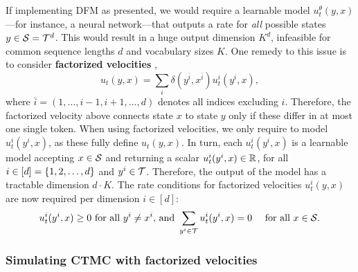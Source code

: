 \documentclass{fairmeta}
\newcommand{\highlight}[1]{{\color{metablue} \textbf{#1}}}
\numberwithin{equation}{section}
\begin{document}
If implementing DFM as presented, we would require a learnable model $u_t^\theta(y, x)$---for instance, a neural network---that outputs a rate for \emph{all} possible states $y\in {\mathcal{S}} = {\mathcal{T}}^d$.
This would result in a huge output dimension $K^d$, infeasible for common sequence lengths $d$ and vocabulary sizes $K$.
One remedy to this issue is to consider \highlight{factorized velocities} \citep{campbell2022continuous},
\begin{equation}\label{e:factorized_velocity} 
    u_t(y,x) = \sum_i \delta(y^{\bar{i}}, x^{\bar{i}}) u_t^i(y^i,x), %
\end{equation}
where $\bar{i}=(1,\ldots,i-1,i+1,\ldots,d)$ denotes all indices excluding $i$.
Therefore, the factorized velocity above connects state $x$ to state $y$ only if these differ in at most one single token.
When using factorized velocities, we only require to model $u_t^i(y^i,x)$, as these fully define $u_t(y,x)$.
In turn, each $u_t^i(y^i,x)$ is a learnable model accepting $x\in {\mathcal{S}}$ and returning a scalar $u_t^i(y^i,x)\in \mathbb R$, for all $i\in [d]=\left\{1,2,\ldots,d\right\}$ and $y^i\in {\mathcal{T}}$.
Therefore, the output of the model has a tractable dimension $d\cdot K$. The rate conditions for factorized velocities $u_t^i(y,x)$ are now required per dimension $i\in [d]$:
\begin{equation}
    u_t^i(y^i,x)\geq 0 \text{ for all } y^i\ne x^i\text{, and } \sum_{y^i\in{\mathcal{T}}}u^i_t(y^i,x)=0\quad \text{ for all }x\in{\mathcal{S}}.
\end{equation}


\subsubsection{Simulating CTMC with factorized velocities}\label{s:Simulating CTMC with factorized velocities}
\end{document}

